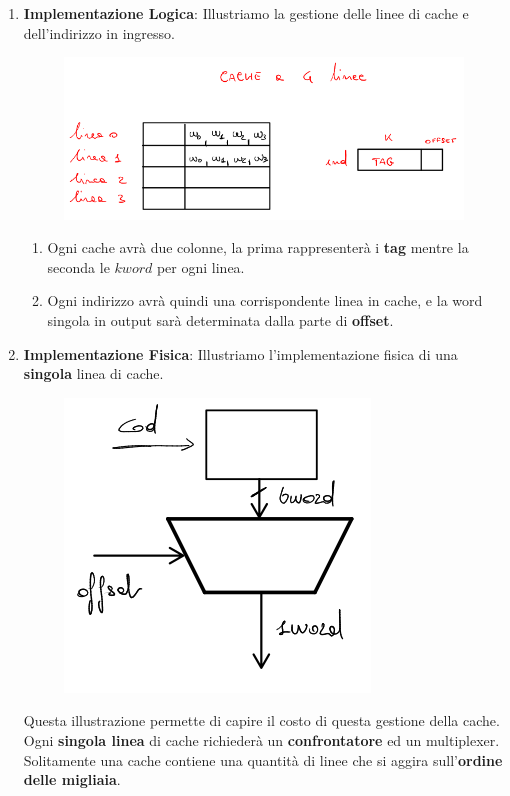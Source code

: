 \documentclass{article}
\begin{document}
\begin{enumerate}
    \item \textbf{Implementazione Logica}: Illustriamo la gestione delle linee di cache e dell'indirizzo in ingresso.
    \begin{figure}[htbp]
        \center
        \includegraphics[scale=0.5]{img/ind_associativo_logico.png}
    \end{figure}
    \begin{enumerate}
        \item Ogni cache avrà due colonne, la prima rappresenterà i \textbf{tag} mentre la seconda le $kword$ per ogni linea.
        \item Ogni indirizzo avrà quindi una corrispondente linea in cache, e la word singola in output sarà determinata dalla parte di \textbf{offset}.
    \end{enumerate}

    \vspace*{15px}
    
    \item \textbf{Implementazione Fisica}: Illustriamo l'implementazione fisica di una \textbf{singola} linea di cache.
    \begin{figure}[htbp]
        \center
        \includegraphics[scale=0.5]{img/ind_associativo_fisico.png}
    \end{figure}
    \vspace*{15px}
    \newline
    Questa illustrazione permette di capire il costo di questa gestione della cache. Ogni \textbf{singola linea} di cache richiederà un \textbf{confrontatore} ed un multiplexer. Solitamente una cache contiene una quantità di linee che si aggira sull'\textbf{ordine delle migliaia}.
\end{enumerate}
\end{document}
